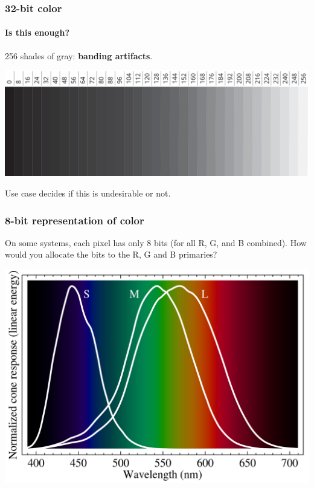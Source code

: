 \documentclass{beamer}
\begin{document}
\begin{frame}
    \frametitle{32-bit color}
    \framesubtitle{Is this enough?}

    256 shades of gray: \textbf{banding artifacts}.

    \begin{center}
        \includegraphics[scale=0.25]{greyscale-levels.png}
    \end{center}

    Use case decides if this is undesirable or not.

\end{frame}

\begin{frame}
    \frametitle{8-bit representation of color}
    On some systems, each pixel has only 8 bits (for all R, G, and B combined). 
    How would you allocate the bits to the R, G and B primaries?

    \begin{center}
        \includegraphics[scale=0.2]{cone-vision.png}
    \end{center}

\end{frame}
\end{document}
